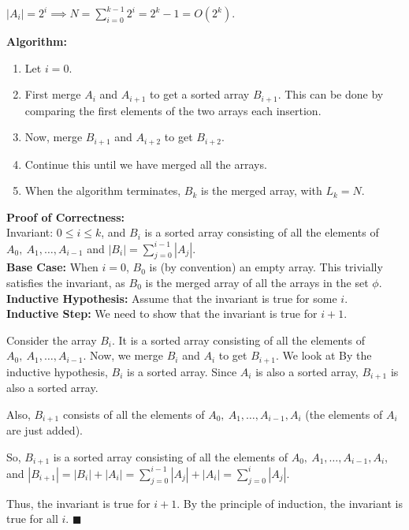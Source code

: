 \documentclass[a4paper]{article}
\begin{document}
\begin{enumerate}
    $|A_i| = 2^i \implies N = \sum_{i=0}^{k-1} 2^i = 2^k - 1 = O(2^k)$.

    \textbf{Algorithm:}
    \begin{enumerate}[label=\arabic*.]
        \item Let $i = 0$.
        \item First merge $A_i$ and $A_{i+1}$ to get a sorted array $B_{i+1}$. This can be done by comparing the first elements of the two arrays each insertion.
        \item Now, merge $B_{i+1}$ and $A_{i+2}$ to get $B_{i+2}$.
        \item Continue this until we have merged all the arrays.
        \item When the algorithm terminates, $B_k$ is the merged array, with $L_k = N$.
    \end{enumerate}

    \textbf{Proof of Correctness:}\\
    Invariant: $0 \leq i \leq k$, and $B_i$ is a sorted array consisting of all the elements of $A_0,\  A_1, \dots, A_{i-1}$ and $|B_i| = \sum_{j=0}^{i-1} |A_j|$.\\
    
    \textbf{Base Case:} When $i = 0$, $B_0$ is (by convention) an empty array. This trivially satisfies the invariant, as $B_0$ is the merged array of all the arrays in the set $\phi$.\\

    \textbf{Inductive Hypothesis:} Assume that the invariant is true for some $i$.\\
    
    \textbf{Inductive Step:} We need to show that the invariant is true for $i+1$.

    Consider the array $B_i$. It is a sorted array consisting of all the elements of $A_0,\  A_1, \dots, A_{i-1}$. Now, we merge $B_i$ and $A_i$ to get $B_{i+1}$. We look at  By the inductive hypothesis, $B_i$ is a sorted array. Since $A_i$ is also a sorted array, $B_{i+1}$ is also a sorted array.

    Also, $B_{i+1}$ consists of all the elements of $A_0,\  A_1, \dots, A_{i-1}, A_i$ (the elements of $A_i$ are just added).

    So, $B_{i+1}$ is a sorted array consisting of all the elements of $A_0,\  A_1, \dots, A_{i-1}, A_i$, and $|B_{i+1}| = |B_i| + |A_i| = \sum_{j=0}^{i-1} |A_j| + |A_i| = \sum_{j=0}^{i} |A_j|$.

    Thus, the invariant is true for $i+1$. By the principle of induction, the invariant is true for all $i$. $\blacksquare$\\


\end{enumerate}
\end{document}
